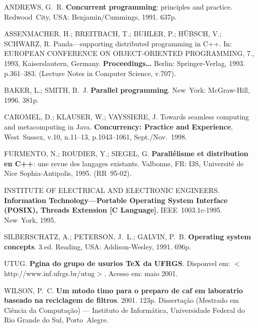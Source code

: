 \documentclass[diss]{template/setrem}
\begin{document}
%
\begin{thebibliography}{este-parametro-nao-eh-usado-pelo-estilo-ABNT}

 ANDREWS,
  G.~R\@. \textbf{Concurrent programming}: principles and
  practice. Redwood~City, USA: Benjamin/Cummings, 1991. 637p.
  
 ASSENMACHER, H.;
  BREITBACH, T.; BUHLER, P.; H{\"U}BSCH, V.; SCHWARZ, R\@.
  Panda---supporting distributed programming in {C}++. In: EUROPEAN
  CONFERENCE ON OBJECT-ORIENTED PROGRAMMING, 7., 1993, Kaiserslautern,
  Germany. \textbf{Proceedings{\ldots}} Berlin: Springer-Verlag, 1993.
  p.361--383. (Lecture Notes in Computer Science, v.707).

 BAKER, L.; SMITH,
  B.~J\@. \textbf{Parallel programming}. New~York: McGraw-Hill,
  1996. 381p.

  CAROMEL, D.; KLAUSER, W.; VAYSSIERE, J\@. Towards seamless computing
  and metacomputing in {J}ava.  \textbf{Concurrency: Practice and
  Experience}, West~Sussex, v.10, n.11--13, p.1043--1061,
  Sept./Nov.~1998.

 FURMENTO,
  N.; ROUDIER, Y.; SIEGEL, G\@. \textbf{Parall{\'e}lisme et
  distribution en {C}++}: une revue des langages existants. Valbonne,
  FR: I3S, Universit\'{e} de Nice Sophia-Antipolis, 1995. (RR~95-02).

 INSTITUTE OF ELECTRICAL AND ELECTRONIC
  ENGINEERS\@. \textbf{Information Technology---Portable Operating
  System Interface (POSIX), Threads Extension [C Language]},
  \mbox{IEEE}~1003.1c-1995.  New~York, 1995.

  SILBERSCHATZ, A.; PETERSON, J.~L.; GALVIN, P.~B\@. \textbf{Operating
  system concepts}. 3.ed.  Reading, USA: Addison-Wesley, 1991. 696p.

 UTUG\@. \textbf{Pgina do grupo
  de usurios {\TeX} da {UFRGS}}. Disponvel em:
  $<$http://www.inf.ufrgs.br/utug$>$. Acesso em: maio 2001.

 WILSON, P.~C\@. \textbf{Um
  mtodo timo para o preparo de caf em laboratrio baseado na
  reciclagem de filtros}. 2001. 123p.  Disserta{\c{c}}{\~a}o (Mestrado
  em Ci{\^e}ncia da Computa{\c{c}}{\~a}o) --- Instituto de
  Inform{\'a}tica, Universidade Federal do Rio Grande do Sul,
  Porto~Alegre.

\end{thebibliography}
\end{document}

